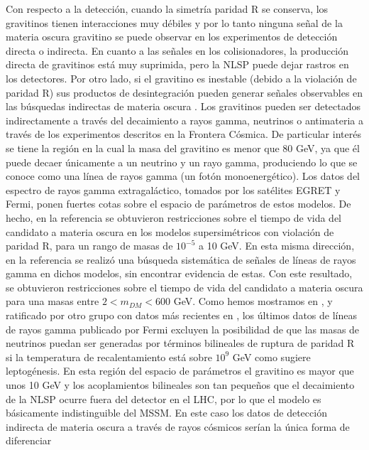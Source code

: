 Con respecto a la detección, cuando la simetría paridad R se conserva,
los gravitinos tienen interacciones muy débiles y por lo tanto ninguna
señal de la materia oscura gravitino se puede observar en los
experimentos de detección directa o indirecta. En cuanto a las señales
en los colisionadores, la producción directa de gravitinos está muy
suprimida, pero la NLSP puede
dejar rastros en los detectores. Por otro lado, si el gravitino es
inestable (debido a la violación de paridad R) sus productos de
desintegración pueden generar señales observables en las búsquedas
indirectas de materia oscura
\cite{Bertone:2007aw,Ibarra:2007wg,Ibarra:2008qg,Covi:2008jy}. Los
gravitinos pueden ser detectados indirectamente a través del
decaimiento a rayos gamma, neutrinos o antimateria a través de los
experimentos descritos en la Frontera Cósmica. De particular interés
se tiene la región en la cual la masa del gravitino es menor que 80
GeV, ya que él puede decaer únicamente a un neutrino y un
rayo gamma, produciendo lo que se conoce como una línea de rayos gamma
(un fotón monoenergético). Los datos del espectro de rayos gamma
extragaláctico, tomados por los satélites EGRET y Fermi, ponen fuertes
cotas sobre el espacio de parámetros de estos modelos. De hecho, en la
referencia \cite{Yuksel:2007dr} se obtuvieron restricciones sobre el
tiempo de vida del candidato a materia oscura en los modelos
supersimétricos con violación de paridad R, para un rango de masas de
$10^{-5}$ a 10 GeV. En esta misma dirección, en la referencia
\cite{Vertongen:2011mu} se realizó una búsqueda sistemática de señales
de líneas de rayos gamma en dichos modelos, sin encontrar evidencia de
estas. Con este resultado, se obtuvieron restricciones sobre el tiempo
de vida del candidato a materia oscura para una masas entre
$2<m_{DM}< 600$ GeV. Como hemos mostramos en \cite{Choi:2010jt},
y ratificado por otro grupo con datos más recientes en
\cite{Garny:2010eg}, los últimos datos de líneas de rayos gamma
publicado por Fermi excluyen la posibilidad de que las masas de
neutrinos puedan ser generadas por términos bilineales de ruptura de
paridad R si la temperatura de recalentamiento está sobre $10^9$ GeV
como sugiere leptogénesis.  En esta región del espacio de parámetros
el gravitino es mayor que unos 10 GeV y los acoplamientos bilineales
son tan pequeños que el decaimiento de la
NLSP ocurre fuera del detector en
el LHC, por lo que el modelo es básicamente indistinguible del
MSSM. En este caso los datos de detección indirecta de materia oscura
a través de rayos cósmicos serían la única forma de diferenciar 
